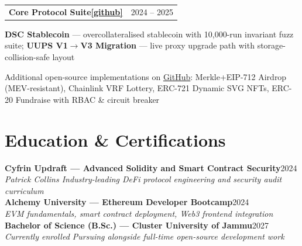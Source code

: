 \documentclass[10pt, a4paper]{article}
\makeatletter
\newcommand{\entry}[3]{%
  \noindent\begin{tabularx}{\linewidth}{@{}X r@{}}
    {\small\bfseries\color{ink} #1} &
    {\fontsize{8}{10}\selectfont\color{dim} #3}
  \end{tabularx}%
  \par\noindent{\fontsize{8.3}{10}\selectfont\color{dim}\itshape #2}\vspace{1pt}%
}
\newcommand{\glink}[1]{\enspace\href{#1}{\fontsize{7.8}{10}\selectfont\color{lnk}[github]}}
\makeatother
\begin{document}
\vspace{0.5pt}
\entry
  {Core Protocol Suite\glink{https://github.com/NexTechArchitect}}
  {Solidity \quad Foundry \quad EVM}
  {2024 -- 2025}
\begin{itemize}{\fontsize{8.8}{13}\selectfont
  \item \textbf{DSC Stablecoin} --- overcollateralised stablecoin with 10,000-run invariant fuzz suite; \textbf{UUPS V1$\to$V3 Migration} --- live proxy upgrade path with storage-collision-safe layout
  \item Additional open-source implementations on \href{https://github.com/NexTechArchitect}{GitHub}: Merkle+EIP-712 Airdrop (MEV-resistant), Chainlink VRF Lottery, ERC-721 Dynamic SVG NFTs, ERC-20 Fundraise with RBAC \& circuit breaker}\end{itemize}

\section{Education \& Certifications}
{\fontsize{8.8}{13}\selectfont\color{soft}
\textbf{Cyfrin Updraft --- Advanced Solidity and Smart Contract Security}\hfill{\color{dim}2024}\\
{\color{dim}\itshape Patrick Collins \enspace\textbar\enspace Industry-leading DeFi protocol engineering and security audit curriculum}\\[2pt]
\textbf{Alchemy University --- Ethereum Developer Bootcamp}\hfill{\color{dim}2024}\\
{\color{dim}\itshape EVM fundamentals, smart contract deployment, Web3 frontend integration}\\[2pt]
\textbf{Bachelor of Science (B.Sc.) --- Cluster University of Jammu}\hfill{\color{dim}2027}\\
{\color{dim}\itshape Currently enrolled \enspace\textbar\enspace Pursuing alongside full-time open-source development work}}
\end{document}

